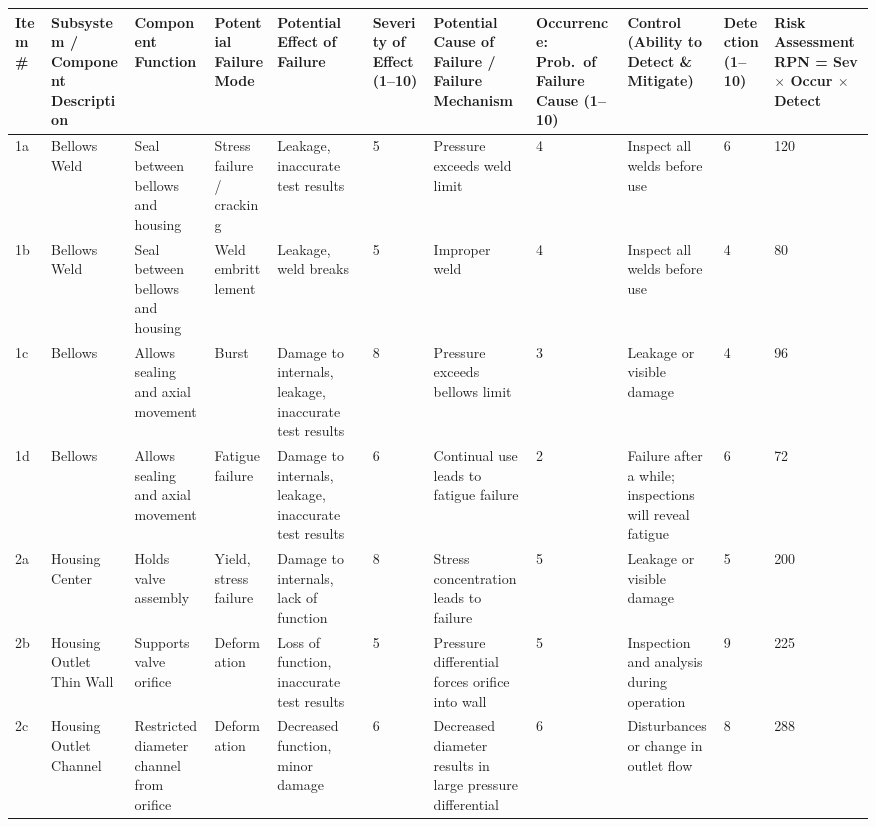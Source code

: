 \documentclass{article}
\begin{document}
\setlength{\tabcolsep}{8pt}
\renewcommand{\arraystretch}{1.6}

			\begin{table}[h]
			\centering
			\begin{tabular}{
				W{0.45in}
				W{0.9in}
				W{0.85in}
				W{1.0in}
				W{1.2in}
				W{1in}
				W{1.3in}
				W{1.2in}
				W{1.35in}
				W{0.85in}
				W{1.4in}
			}
			\toprule
			\textbf{Item \#} &
			\textbf{Subsystem / Component Description} &
			\textbf{Component Function} &
			\textbf{Potential Failure Mode} &
			\textbf{Potential Effect of Failure} &
			\textbf{Severity of Effect (1--10)} &
			\textbf{Potential Cause of Failure / Failure Mechanism} &
			\textbf{Occurrence: Prob.\ of Failure Cause (1--10)} &
			\textbf{Control (Ability to Detect \& Mitigate)} &
			\textbf{Detection (1--10)} &
			\textbf{Risk Assessment RPN = Sev $\times$ Occur $\times$ Detect} \\
			\midrule

			1a & Bellows Weld & Seal between bellows and housing & Stress failure / cracking & Leakage, inaccurate test results & 5 & Pressure exceeds weld limit & 4 & Inspect all welds before use & 6 & 120 \\
			1b & Bellows Weld & Seal between bellows and housing & Weld embrittlement & Leakage, weld breaks & 5 & Improper weld & 4 & Inspect all welds before use & 4 & 80 \\
			1c & Bellows & Allows sealing and axial movement & Burst & Damage to internals, leakage, inaccurate test results & 8 & Pressure exceeds bellows limit & 3 & Leakage or visible damage & 4 & 96 \\
			1d & Bellows & Allows sealing and axial movement & Fatigue failure & Damage to internals, leakage, inaccurate test results & 6 & Continual use leads to fatigue failure & 2 & Failure after a while; inspections will reveal fatigue & 6 & 72 \\
			2a & Housing Center & Holds valve assembly & Yield, stress failure & Damage to internals, lack of function & 8 & Stress concentration leads to failure & 5 & Leakage or visible damage & 5 & 200 \\

			2b & Housing Outlet Thin Wall & Supports valve orifice & Deformation & Loss of function, inaccurate test results & 5 & Pressure differential forces orifice into wall & 5 & Inspection and analysis during operation & 9 & 225 \\

			2c & Housing Outlet Channel & Restricted diameter channel from orifice & Deformation & Decreased function, minor damage & 6 & Decreased diameter results in large pressure differential & 6 & Disturbances or change in outlet flow & 8 & 288 \\


\end{tabular}
\end{table}
\end{document}
